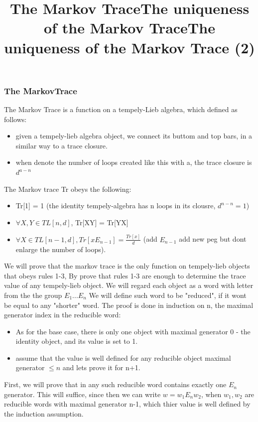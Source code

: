 \documentclass{article}
\begin{document}
{\subsubsection{The MarkovTrace}
\title{The Markov Trace}
The Markov Trace is a function on a tempely-Lieb algebra, which defined as follows:
\begin{itemize}
\item given a tempely-lieb algebra object, we connect its buttom and top bars, in a similar way to
a trace closure.
\item when denote the number of loops created like this with a, the trace closure is \(d^{a-n}\)
\end{itemize}
The Markov trace Tr obeys the following:
\begin{itemize}
\item Tr[1] = 1 (the identity tempely-algebra has n loops in its clousre, \(d^{n-n} = 1\))
\item \(\forall X,Y \in TL[n,d]\), Tr[XY] = Tr[YX] 
\item \(\forall X \in TL[n-1, d], Tr[xE_{n-1}]=\frac{Tr[x]}{d}\) (add \(E_{n-1}\) add new peg but dont enlarge the number of loops).
\end{itemize}


\title{The uniqueness of the Markov Trace}
We will prove that the markov trace is the only function on tempely-lieb objects that obeys rules 1-3,
By prove that rules 1-3 are enough to determine the trace value of any tempely-lieb object.
We will regard each object as a word with letter from the the group \(E_{1}...E_{n}\)
We will define such word to be "reduced", if it wont be equal to any "shorter" word.
The proof is done in induction on n, the maximal generator index in the reducible word:
\begin{itemize}
\item As for the base case, there is only one object with maximal generator 0 - the identity object, and its value is set to 1.
\item assume that the value is well defined for any reducible object maximal generator \(\leq n\) and lets prove it for n+1. 
\end{itemize}


\title{The uniqueness of the Markov Trace (2)}
First, we will prove that in any such reducible word contains exactly one \(E_{n}\) generator.
This will suffice, since then we can write \(w=w_{1}E_{n}w_{2}\), when \(w_{1}, w_{2}\) are
reducible words with maximal generator n-1, which thier value is well defined by the induction assumption.

}
\end{document}
